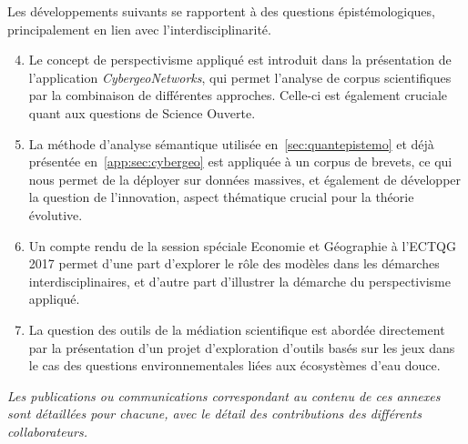 Les développements suivants se rapportent à des questions épistémologiques, principalement en lien avec l'interdisciplinarité.
\begin{enumerate}\setcounter{enumi}{3}
	\item Le concept de perspectivisme appliqué est introduit dans la présentation de l'application \textit{CybergeoNetworks}, qui permet l'analyse de corpus scientifiques par la combinaison de différentes approches. Celle-ci est également cruciale quant aux questions de Science Ouverte.
	\item La méthode d'analyse sémantique utilisée en~\ref{sec:quantepistemo} et déjà présentée en~\ref{app:sec:cybergeo} est appliquée à un corpus de brevets, ce qui nous permet de la déployer sur données massives, et également de développer la question de l'innovation, aspect thématique crucial pour la théorie évolutive.
	\item Un compte rendu de la session spéciale Economie et Géographie à l'ECTQG 2017 permet d'une part d'explorer le rôle des modèles dans les démarches interdisciplinaires, et d'autre part d'illustrer la démarche du perspectivisme appliqué.
	\item La question des outils de la médiation scientifique est abordée directement par la présentation d'un projet d'exploration d'outils basés sur les jeux dans le cas des questions environnementales liées aux écosystèmes d'eau douce.
\end{enumerate}



\stars

\textit{Les publications ou communications correspondant au contenu de ces annexes sont détaillées pour chacune, avec le détail des contributions des différents collaborateurs.}















